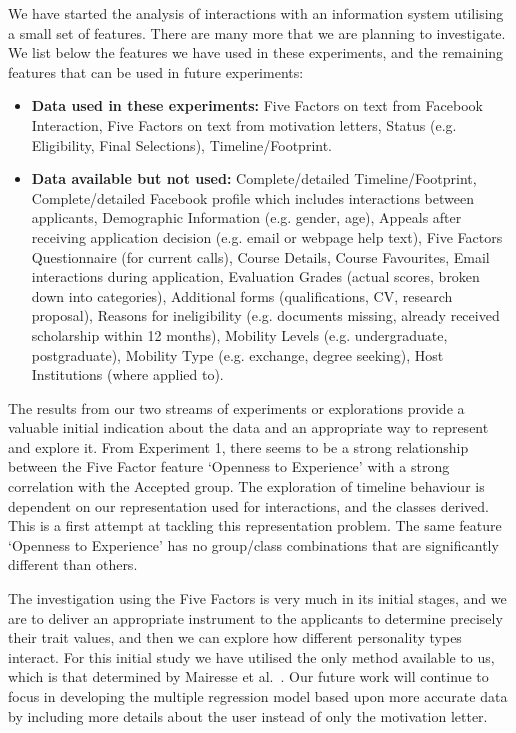 \documentclass[letterpaper]{article}
\begin{document}
We have started the analysis of interactions with an information
system utilising a small set of features. There are many more that we
are planning to investigate. We list below the features we have used
in these experiments, and the remaining features that can be used in
future experiments:

\begin{itemize}
\item {\textbf{Data used in these experiments:}} Five Factors on text
  from Facebook Interaction, Five Factors on text from motivation
  letters, Status (e.g. Eligibility, Final Selections),
  Timeline/Footprint.
\item {\textbf{Data available but not used:}} Complete/detailed
  Timeline/Footprint, Complete/detailed Facebook profile which
  includes interactions between applicants, Demographic Information
  (e.g. gender, age), Appeals after receiving application decision
  (e.g. email or webpage help text), Five Factors Questionnaire (for
  current calls), Course Details, Course Favourites, Email
  interactions during application, Evaluation Grades (actual scores,
  broken down into categories), Additional forms (qualifications, CV,
  research proposal), Reasons for ineligibility (e.g. documents
  missing, already received scholarship within 12 months), Mobility
  Levels (e.g. undergraduate, postgraduate), Mobility Type
  (e.g. exchange, degree seeking), Host Institutions (where applied to).
\end{itemize}

The results from our two streams of experiments or explorations
provide a valuable initial indication about the data and an
appropriate way to represent and explore it. From Experiment 1, there
seems to be a strong relationship between the Five Factor feature
`Openness to Experience' with a strong correlation with the Accepted
group. The exploration of timeline behaviour is dependent on our
representation used for interactions, and the classes derived. This is
a first attempt at tackling this representation problem. The same
feature `Openness to Experience' has no group/class combinations that
are significantly different than others.

The investigation using the Five Factors is very much in its initial
stages, and we are to deliver an appropriate instrument to the
applicants to determine precisely their trait values, and then we can
explore how different personality types interact. For this initial
study we have utilised the only method available to us, which is that
determined by Mairesse et al.~\cite{mairesse-et-al:2007}. Our future
work will continue to focus in developing the multiple regression
model based upon more accurate data by including more details about
the user instead of only the motivation letter.
\end{document}

